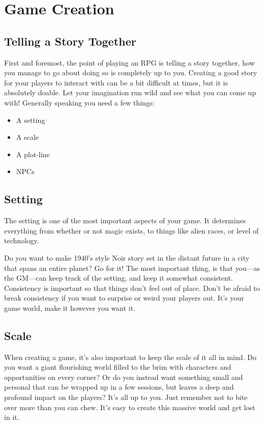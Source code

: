 \chapter{Game Creation}
\section{Telling a Story Together}
First and foremost, the point of playing an RPG is telling a story together, how you manage to go about doing so is completely up to you.
Creating a good story for your players to interact with can be a bit difficult at times, but it is absolutely doable.
Let your imagination run wild and see what you can come up with!
Generally speaking you need a few things:
\begin{itemize}
    \item A setting
    \item A scale
    \item A plot-line
    \item NPCs
\end{itemize}

\section{Setting}
The setting is one of the most important aspects of your game.
It determines everything from whether or not magic exists, to things like alien races, or level of technology.

Do you want to make 1940's style Noir story set in the distant future in a city that spans an entire planet? Go for it!
The most important thing, is that you---as the GM---can keep track of the setting, and keep it somewhat consistent.
Consistency is important so that things don't feel out of place. 
Don't be afraid to break consistency if you want to surprise or weird your players out.
It's your game world, make it however you want it.

\section{Scale}
When creating a game, it's also important to keep the scale of it all in mind.
Do you want a giant flourishing world filled to the brim with characters and opportunities on every corner? 
Or do you instead want something small and personal that can be wrapped up in a few sessions, but leaves a deep and profound impact on the players?
It's all up to you.
Just remember not to bite over more than you can chew.
It's easy to create this massive world and get lost in it.

